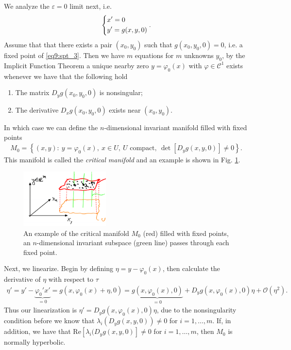 We analyze the $\varepsilon=0$ limit next, i.e.
\begin{align}
	\begin{dcases}
		x' = 0 \\
		y' = g(x,y,0)
	\end{dcases}
	.\label{eq9:spt_3}
\end{align}
Assume that that there exists a pair $(x_0, y_0)$ such that $g(x_0, y_0,0)=0$, i.e. a fixed point of \eqref{eq9:spt_3}. Then we have $m$ equations for $m$ unknowns $y_0$, by the Implicit Function Theorem a unique nearby zero $y = \varphi_0(x)$ with $\varphi \in \mathcal{C}^{1}$ exists whenever we have that the following hold
\begin{enumerate}
	\item The matrix $D_{y}g(x_0, y_0, 0)$ is nonsingular;
	\item The derivative $D_{x}g(x_0, y_0, 0)$ exists near $(x_0, y_0)$.
\end{enumerate}
In which case we can define the $n$-dimensional invariant manifold filled with fixed points 
\begin{align}
\boxed{
M_0 = \left\{ (x,y):\ y= \varphi_0(x),\ x\in U,\ U  \textrm{ compact},\ \det\left[D_{y}g(x,y,0)\right]\neq 0 \right\} .
}
\end{align}
This manifold is called the \emph{critical manifold} and an example is shown in Fig. \ref{fig:critical_mfd_def}.
\begin{figure}[h!]
	\centering
	\includegraphics[width=0.4\textwidth]{figures/ch9/17crit_mfd_def.png}
	\caption{An example of the critical manifold $M_0$ (red) filled with fixed points, an $n$-dimensional invariant subspace (green line) passes through each fixed point.}
	\label{fig:critical_mfd_def}
\end{figure}

Next, we linearize. Begin by defining $\eta = y - \varphi_0(x)$, then calculate the derivative of $\eta $ with respect to $\tau$ 
\begin{align}
	\eta' = y' - \underbrace{\varphi_0' x'}_{=0} = g(x, \varphi_0(x) + \eta, 0) = \underbrace{g(x, \varphi_0(x), 0) }_{=0} + D_{y}g(x, \varphi_0(x), 0) \eta + \mathcal{O}(\eta^2).
\end{align}
Thus our linearization is $\eta' = D_{y} g(x, \varphi_0(x), 0 ) \eta$, due to the nonsingularity condition before we know that $\lambda_{i}(D_{y}g(x,y,0)) \neq 0$ for $i=1,\ldots, m$. If, in addition, we have that $ \textrm{Re}[\lambda_i(D_{y}g(x,y,0)]\neq 0  $ for $i = 1, \ldots, m$, then $M_0$ is normally hyperbolic.

